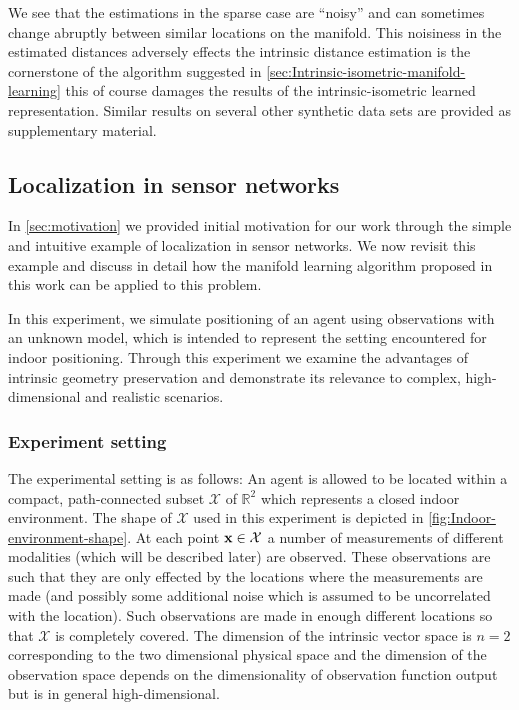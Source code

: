 	We see that the estimations in the sparse case are ``noisy'' and can sometimes change abruptly between similar locations on the manifold. This noisiness in the estimated distances adversely effects the intrinsic distance estimation is the cornerstone of the algorithm suggested in \cref{sec:Intrinsic-isometric-manifold-learning} this of course damages the results of the intrinsic-isometric learned representation. Similar results on several other synthetic data sets are provided as supplementary material.
	
	\subsection{Localization in sensor networks}
	\label{ssec:localization}
	
	In \cref{sec:motivation} we provided initial motivation for our work through the simple and intuitive example of localization in sensor networks. We now revisit this example and discuss in detail how the manifold learning algorithm proposed in this work can be applied to this problem. 
	
	In this experiment, we simulate positioning of an agent using observations with an unknown model, which is intended to represent the setting encountered for indoor positioning. Through this experiment we examine the advantages of intrinsic geometry preservation and demonstrate its relevance to complex, high-dimensional and realistic scenarios.
	
	\subsubsection{Experiment setting}
	\label{sssec:Experiment-setting}
	
	The experimental setting is as follows: An agent is allowed to be located within a compact, path-connected subset $\mathcal{X}$ of $\mathbb{R}^{2}$ which represents a closed indoor environment. The shape of $\mathcal{X}$ used in this experiment is depicted in \cref{fig:Indoor-environment-shape}. At each point $\mathbf{x}\in\text{\ensuremath{\mathcal{X}}}$ a number of measurements of different modalities (which will be described later) are observed. These observations are such that they are only effected by the locations where the measurements are made (and possibly some additional noise which is assumed to be uncorrelated with the location). Such observations are made in enough different locations so that $\mathcal{X}$ is completely covered. The dimension of the intrinsic vector space is $n=2$ corresponding to the two dimensional physical space and the dimension of the observation space depends on the dimensionality of observation function output but is in general high-dimensional. 
	
